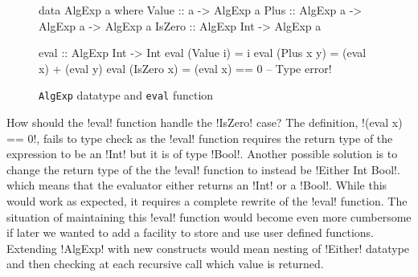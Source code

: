 \documentclass[screen,nonacm]{acmart}
\begin{document}
\begin{figure}[ht]
\centering
\begin{minipage}[ht]{0.6\linewidth}
\begin{code}
data AlgExp a where
  Value  :: a                    -> AlgExp a
  Plus   :: AlgExp a -> AlgExp a -> AlgExp a
  IsZero :: AlgExp Int           -> AlgExp a
\end{code}
\end{minipage}%
\begin{minipage}[ht]{0.4\linewidth}
\begin{code}
eval :: AlgExp Int -> Int
eval (Value i) = i
eval (Plus x y) = (eval x) + (eval y)
eval (IsZero x) = (eval x) == 0 -- Type error!
\end{code}
\end{minipage}
\caption{\texttt{AlgExp} datatype and \texttt{eval} function}
\label{fig:algexp-eval}
\end{figure}
How should the !eval! function handle the !IsZero! case? The definition, !(eval x) == 0!, fails to type check as the !eval! function requires the return type of the expression to be an !Int! but it is of type !Bool!. Another possible solution is to change the return type of the the !eval! function to instead be !Either Int Bool!. which means that the evaluator either returns an !Int! or a !Bool!. While this would work as expected, it requires a complete rewrite of the !eval! function. The situation of maintaining this !eval! function would become even more cumbersome if later we wanted to add a facility to store and use user defined functions. Extending !AlgExp! with new constructs would mean nesting of !Either! datatype and then checking at each recursive call which value is returned.
\end{document}
